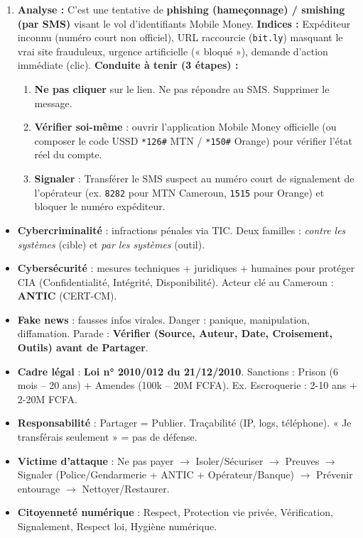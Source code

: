 \documentclass[11pt]{article}
\begin{document}
\begin{corrige}
\begin{enumerate}
\begin{enumerate}
      \end{enumerate}
\item \textbf{Analyse :} C'est une tentative de \textbf{phishing (hameçonnage) / smishing (par SMS)} visant le vol d'identifiants Mobile Money.
      \textbf{Indices :} Expéditeur inconnu (numéro court non officiel), URL raccourcie (\texttt{bit.ly}) masquant le vrai site frauduleux, urgence artificielle (« bloqué »), demande d'action immédiate (clic).
      \textbf{Conduite à tenir (3 étapes) :}
      \begin{enumerate}
      \item \textbf{Ne pas cliquer} sur le lien. Ne pas répondre au SMS. Supprimer le message.
      \item \textbf{Vérifier soi-même} : ouvrir l'application Mobile Money officielle (ou composer le code USSD \texttt{*126\#} MTN / \texttt{*150\#} Orange) pour vérifier l'état réel du compte.
      \item \textbf{Signaler} : Transférer le SMS suspect au numéro court de signalement de l'opérateur (ex. \texttt{8282} pour MTN Cameroun, \texttt{1515} pour Orange) et bloquer le numéro expéditeur.
      \end{enumerate}
\end{enumerate}
\end{corrige}

\begin{aretenir}
\begin{itemize}
\item \textbf{Cybercriminalité} : infractions pénales via TIC. Deux familles : \emph{contre les systèmes} (cible) et \emph{par les systèmes} (outil).
\item \textbf{Cybersécurité} : mesures techniques + juridiques + humaines pour protéger CIA (Confidentialité, Intégrité, Disponibilité). Acteur clé au Cameroun : \textbf{ANTIC} (CERT-CM).
\item \textbf{Fake news} : fausses infos virales. Danger : panique, manipulation, diffamation. Parade : \textbf{Vérifier (Source, Auteur, Date, Croisement, Outils) avant de Partager}.
\item \textbf{Cadre légal} : \textbf{Loi n° 2010/012 du 21/12/2010}. Sanctions : Prison (6 mois -- 20 ans) + Amendes (100k -- 20M FCFA). Ex. Escroquerie : 2-10 ans + 2-20M FCFA.
\item \textbf{Responsabilité} : Partager = Publier. Traçabilité (IP, logs, téléphone). « Je transférais seulement » = pas de défense.
\item \textbf{Victime d'attaque} : Ne pas payer $\to$ Isoler/Sécuriser $\to$ Preuves $\to$ Signaler (Police/Gendarmerie + ANTIC + Opérateur/Banque) $\to$ Prévenir entourage $\to$ Nettoyer/Restaurer.
\item \textbf{Citoyenneté numérique} : Respect, Protection vie privée, Vérification, Signalement, Respect loi, Hygiène numérique.
\end{itemize}
\end{aretenir}
\end{document}
